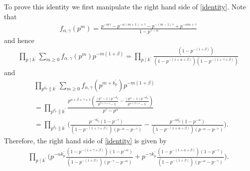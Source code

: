 \documentclass[oneside, 12pt]{amsart}
\theoremstyle{definition}
\begin{document}
To prove this identity we first manipulate the right hand side of \eqref{identity}. Note that 
\begin{align*}
f_{\alpha,\gamma}(p^{m})=\frac{p^{-m\gamma}-p^{-\alpha(m+1)+\gamma}-p^{-(m-1)\gamma}+p^{-\alpha m+\gamma}}{1-p^{\gamma-\alpha}}
\end{align*}
and hence
\begin{align*}
\prod_{p\mid k^\prime} \sum_{m\geq 0}f_{\alpha, \gamma}(p^{m})p^{-m(1+\beta)}=\prod_{p\mid k^\prime} \frac{(1-p^{-(1+\beta)})}{(1-p^{-(1+\alpha+\beta)})(1-p^{-(1+\gamma+\beta)})}
\end{align*}
and 
\begin{align*}
&\prod_{p^{k^\prime_p}\| k^\prime} \sum_{m\geq 0} f_{\alpha, \gamma}(p^{m+k^\prime_p})p^{-m(1+\beta)}\\
&=\prod_{p^{k^\prime_p}\| k^\prime} \frac{p^{\alpha +\beta +\gamma +1} \left(\frac{\left(p^{\gamma }-1\right) p^{-\gamma {k^\prime_p}}}{p^{\beta +\gamma+1}-1}-\frac{\left(p^{\alpha }-1\right) p^{-\alpha  {k^\prime_p}}}{p^{\alpha +\beta +1}-1}\right)}{p^{\gamma }-p^{\alpha }}\\
&=\prod_{p^{k^\prime_p}\| k^\prime}\bigg(\frac{p^{-\gamma k^\prime_p}(1-p^{-\gamma})}{(1-p^{-(1+\gamma+\beta)})(p^{-\alpha}-p^{-\gamma})}-\frac{p^{-\alpha k^\prime_p}(1-p^{-\alpha})}{(1-p^{-(1+\alpha+\beta)})(p^{-\alpha}-p^{-\gamma})}\bigg).
\end{align*}
Therefore, the right hand side of \eqref{identity} is given by
\begin{align}
\label{rhs}
\prod_{p\mid k^\prime} \bigg(p^{-\alpha k^\prime_p}\frac{(1-p^{-(1+\gamma+\beta)})(1-p^{-\alpha})}{(1-p^{-(1+\beta)})(p^{-\gamma}-p^{-\alpha})}+p^{-\gamma k^\prime_p} \frac{(1-p^{-(1+\alpha+\beta)})(1-p^{-\gamma})}{(1-p^{-(1+\beta)})(p^{-\alpha}-p^{-\gamma})}\bigg).
\end{align}
\end{document}
